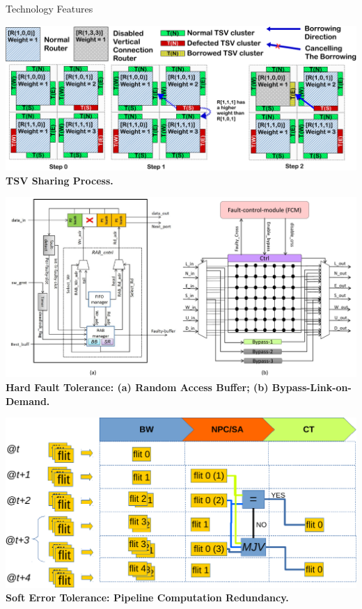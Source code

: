 \documentclass[a1paper,portrait]{baposter}
\let\oldtextbf\textbf
\renewcommand{\textbf}[1]{\textcolor{aaublue1}{\oldtextbf{#1}}}
\begin{document}
\begin{poster}
\begin{posterbox}[name=tech,column=1]{Technology Features}
        
        \begin{center}
            \includegraphics[width=.8\linewidth]{figs/case1.pdf} \\
            \vspace*{-0.0cm}\textbf{\small TSV Sharing Process.}
        \end{center}
        
         \begin{center}
             \includegraphics[width=.85\linewidth]{figs/hft.pdf} \\
            \vspace*{-0cm}\textbf{\small Hard Fault Tolerance: (a) Random Access Buffer; (b) Bypass-Link-on-Demand.}
        \end{center}
        
        \begin{center}
            \includegraphics[width=.8\linewidth]{figs/sft.pdf} \\
            \vspace*{-0cm}\textbf{\small Soft Error Tolerance: Pipeline Computation Redundancy.}
        \end{center}
\end{posterbox}


\end{poster}
\end{document}
